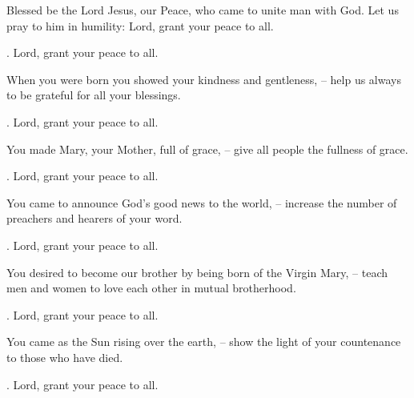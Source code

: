 \lettrine[loversize=0.15,lines=2]{B}{}lessed be the Lord Jesus, our Peace, who came to unite man with God. Let us pray to him in humility: Lord, grant your peace to all.
\par \Rbar. Lord, grant your peace to all.

When you were born you showed your kindness and gentleness,
– help us always to be grateful for all your blessings.
\par \Rbar. Lord, grant your peace to all.

You made Mary, your Mother, full of grace,
– give all people the fullness of grace.
\par \Rbar. Lord, grant your peace to all.

You came to announce God’s good news to the world,
– increase the number of preachers and hearers of your word.
\par \Rbar. Lord, grant your peace to all.

You desired to become our brother by being born of the Virgin Mary,
– teach men and women to love each other in mutual brotherhood.
\par \Rbar. Lord, grant your peace to all.

You came as the Sun rising over the earth,
– show the light of your countenance to those who have died.
\par \Rbar. Lord, grant your peace to all.
